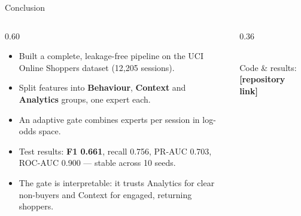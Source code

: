 \documentclass[aspectratio=169,11pt]{beamer}
\newcommand{\placeholder}[1]{{\color{ctx}\textbf{[#1]}}}
\begin{document}
\begin{frame}{Conclusion}
  \begin{columns}[c,onlytextwidth]
    \begin{column}{0.60\textwidth}
      \begin{itemize}\setlength{\itemsep}{5pt}\small
        \item Built a complete, leakage-free pipeline on the UCI Online Shoppers dataset (12,205 sessions).
        \item Split features into \textcolor{behav}{\textbf{Behaviour}}, \textcolor{ctx}{\textbf{Context}} and \textcolor{anal}{\textbf{Analytics}} groups, one expert each.
        \item An adaptive gate combines experts per session in log-odds space.
        \item Test results: \textbf{F1 0.661}, recall 0.756, PR-AUC 0.703, ROC-AUC 0.900 --- stable across 10 seeds.
        \item The gate is interpretable: it trusts Analytics for clear non-buyers and Context for engaged, returning shoppers.
      \end{itemize}
    \end{column}
    \begin{column}{0.36\textwidth}
      \centering
      \\[6pt]
      {\scriptsize\color{muted}Code \& results: \placeholder{repository link}}
    \end{column}
  \end{columns}
\end{frame}
\end{document}
